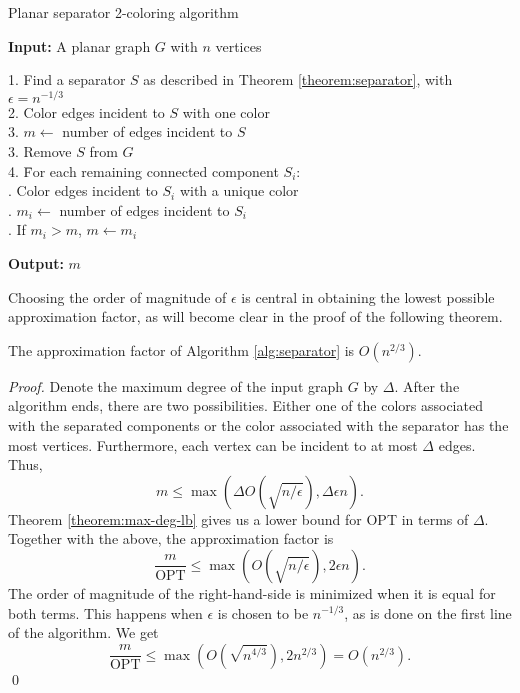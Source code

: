 \documentclass[runningheads, a4paper]{llncs}
\begin{document}
\begin{algorithm}[htb]
\caption{Planar separator 2-coloring algorithm}
\label{alg:separator}
\textbf{Input:} A planar graph $G$ with $n$ vertices
\begin{tabbing}
1. Find a separator $S$ as described in Theorem \ref{theorem:separator}, with $\epsilon = n^{-1/3}$ \\
2. Color edges incident to $S$ with one color \\
3. $m \longleftarrow$ number of edges incident to $S$ \\
3. Remove $S$ from $G$ \\
4. \= For each remaining connected component $S_i$: \\
   . Color edges incident to $S_i$ with a unique color \\
   . $m_i \longleftarrow$ number of edges incident to $S_i$ \\
   . If $m_i > m$, $m \longleftarrow m_i$
\end{tabbing}
\textbf{Output:} $m$
\end{algorithm}

Choosing the order of magnitude of $\epsilon$ is central in obtaining the lowest possible approximation factor, as will become clear in the proof of the following theorem.

\begin{theorem}
The approximation factor of Algorithm \ref{alg:separator} is $O(n^{2/3})$.
\end{theorem}
\begin{proof}
Denote the maximum degree of the input graph $G$ by $\Delta$. After the algorithm ends, there are two possibilities. Either one of the colors associated with the separated components or the color associated with the separator has the most vertices. Furthermore, each vertex can be incident to at most $\Delta$ edges. Thus,
\begin{displaymath}
m \leq \max \left( \Delta O(\sqrt{n/\epsilon}), \Delta \epsilon n \right).
\end{displaymath}
Theorem \ref{theorem:max-deg-lb} gives us a lower bound for OPT in terms of $\Delta$. Together with the above, the approximation factor is
\begin{displaymath}
\frac{m}{\textrm{OPT}} \leq \max \left( O(\sqrt{n/\epsilon}), 2\epsilon n \right).
\end{displaymath}
The order of magnitude of the right-hand-side is minimized when it is equal for both terms. This happens when $\epsilon$ is chosen to be $n^{-1/3}$, as is done on the first line of the algorithm. We get
\begin{displaymath}
\frac{m}{\textrm{OPT}} \leq \max \left( O(\sqrt{n^{4/3}}), 2n^{2/3} \right) = O(n^{2/3}).
\end{displaymath}
\qed
\end{proof}
\end{document}

